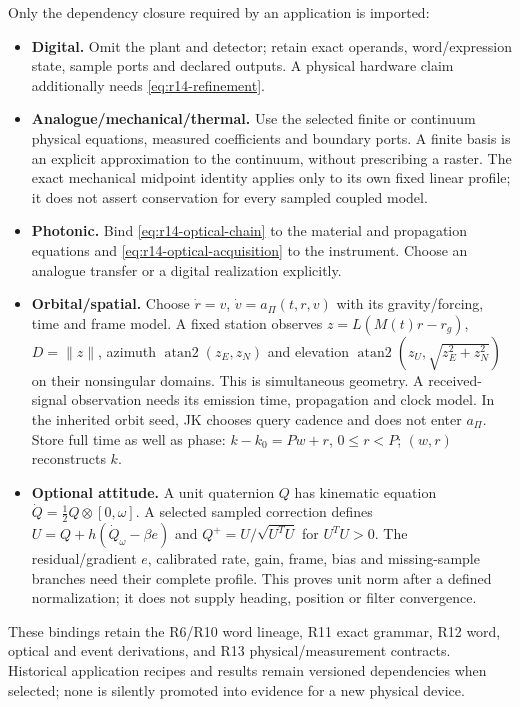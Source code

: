 Only the dependency closure required by an application is imported:
\begin{itemize}
\item \textbf{Digital.} Omit the plant and detector; retain exact operands,
word/expression state, sample ports and declared outputs. A physical hardware
claim additionally needs \eqref{eq:r14-refinement}.
\item \textbf{Analogue/mechanical/thermal.} Use the selected finite or continuum
physical equations, measured coefficients and boundary ports. A finite basis
is an explicit approximation to the continuum, without prescribing a raster.
The exact mechanical midpoint identity applies only to its own fixed linear
profile; it does not assert conservation for every sampled coupled model.
\item \textbf{Photonic.} Bind \eqref{eq:r14-optical-chain} to the material and
propagation equations and \eqref{eq:r14-optical-acquisition} to the instrument.
Choose an analogue transfer or a digital realization explicitly.
\item \textbf{Orbital/spatial.} Choose $\dot r=v$, $\dot v=a_\Pi(t,r,v)$ with
its gravity/forcing, time and frame model. A fixed station observes
$z=L(M(t)r-r_g)$, $D=\|z\|$, azimuth $\operatorname{atan2}(z_E,z_N)$ and
elevation $\operatorname{atan2}(z_U,\sqrt{z_E^2+z_N^2})$ on their nonsingular
domains. This is simultaneous geometry. A received-signal observation needs
its emission time, propagation and clock model. In the inherited orbit seed,
JK chooses query cadence and does not enter $a_\Pi$. Store full time as well as
phase: $k-k_0=Pw+r$, $0\le r<P$; $(w,r)$ reconstructs $k$.
\item \textbf{Optional attitude.} A unit quaternion $Q$ has kinematic equation
$\dot Q=\tfrac12Q\otimes[0,\omega]$. A selected sampled correction defines
$U=Q+h(\dot Q_\omega-\beta e)$ and $Q^+=U/\sqrt{U^TU}$ for $U^TU>0$.
The residual/gradient $e$, calibrated rate, gain, frame, bias and missing-sample
branches need their complete profile. This proves unit norm after a defined
normalization; it does not supply heading, position or filter convergence.
\end{itemize}
These bindings retain the R6/R10 word lineage, R11 exact grammar, R12 word,
optical and event derivations, and R13 physical/measurement contracts. Historical
application recipes and results remain versioned dependencies when selected;
none is silently promoted into evidence for a new physical device.
